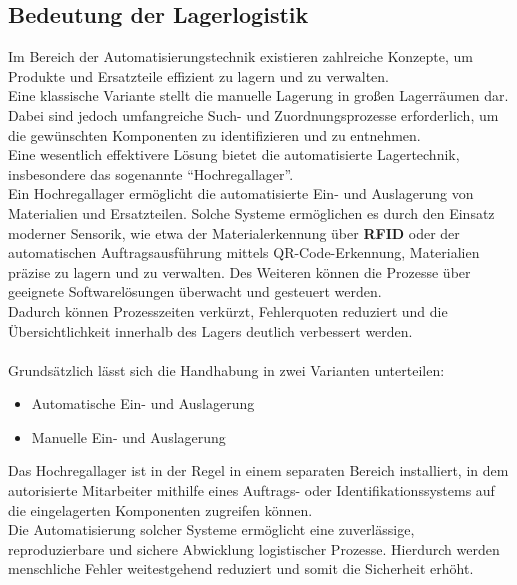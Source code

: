 \subsection{Bedeutung der Lagerlogistik}
Im Bereich der Automatisierungstechnik existieren zahlreiche Konzepte, um Produkte und Ersatzteile effizient zu lagern und zu verwalten.\\
Eine klassische Variante stellt die manuelle Lagerung in großen Lagerräumen dar. Dabei sind jedoch umfangreiche Such- und Zuordnungsprozesse erforderlich, um die gewünschten Komponenten zu identifizieren und zu entnehmen.\\
Eine wesentlich effektivere Lösung bietet die automatisierte Lagertechnik, insbesondere das sogenannte \enquote{Hochregallager}.\\
Ein Hochregallager ermöglicht die automatisierte Ein- und Auslagerung von Materialien und Ersatzteilen. Solche Systeme ermöglichen es durch den Einsatz moderner Sensorik, wie etwa der Materialerkennung über \textbf{RFID} oder der automatischen Auftragsausführung mittels QR-Code-Erkennung, Materialien präzise zu lagern und zu verwalten. Des Weiteren können die Prozesse über geeignete Softwarelösungen überwacht und gesteuert werden.\\
Dadurch können Prozesszeiten verkürzt, Fehlerquoten reduziert und die Übersichtlichkeit innerhalb des Lagers deutlich verbessert werden.\\\\
Grundsätzlich lässt sich die Handhabung in zwei Varianten unterteilen:
\begin{itemize}
	\item Automatische Ein- und Auslagerung
	\item Manuelle Ein- und Auslagerung
\end{itemize}
Das Hochregallager ist in der Regel in einem separaten Bereich installiert, in dem autorisierte Mitarbeiter mithilfe eines Auftrags- oder Identifikationssystems auf die eingelagerten Komponenten zugreifen können.\\
Die Automatisierung solcher Systeme ermöglicht eine zuverlässige, reproduzierbare und sichere Abwicklung logistischer Prozesse. Hierdurch werden menschliche Fehler weitestgehend reduziert und somit die Sicherheit erhöht.
